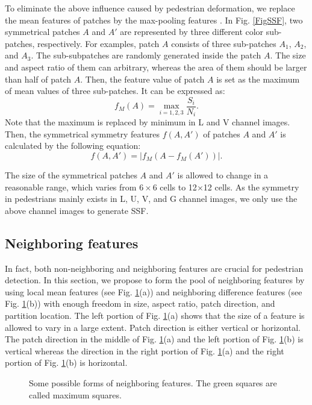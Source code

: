 \documentclass[10pt,twocolumn,letterpaper]{article}
\begin{document}
To eliminate the above influence caused by pedestrian deformation, we 
replace the mean features of patches by the max-pooling features \cite{Wang_Regionlets_ICCV_2013}. In 
Fig. \ref{FigSSF}, two symmetrical patches $A$ and $A'$ are 
represented by three different color sub-patches, respectively. For 
examples, patch $A$ consists of three sub-patches $A_1$, $A_2$, and $A_3$. The sub-subpatches are randomly generated inside the patch $A$. The size and aspect ratio of them can arbitrary, whereas the 
area of them should be larger than half of patch $A$. Then, the feature value of patch 
$A$ is set as the maximum of mean values of three sub-patches. It can be 
expressed as:
\begin{equation}
\label{eqMaxPooling}
f_M(A)=\max_{i=1,2,3}{\frac{S_i}{N_i}}.
\end{equation}
Note that the maximum is replaced by minimum in L and V channel images. Then, the 
symmetrical symmetry features $f(A,A')$ of patches $A$ and $A'$ is calculated by the following equation:
\begin{equation}
\label{eqSSFPooling}
f(A,A')=|f_M(A-f_M(A'))|.
\end{equation}

The size of the symmetrical patches $A$ and $A'$
is allowed to change in a reasonable range, which varies from $6\times 6$ 
cells to 12$\times $12 cells. As the symmetry in pedestrians mainly 
exists in L, U, V, and G channel images, we only use the above channel images to generate SSF.

\subsection{Neighboring features}
In fact, both non-neighboring and neighboring features are crucial for pedestrian detection. In this section, we propose to form the pool of neighboring features by using local mean features (see Fig. \ref{FigNF}(a)) and neighboring difference features (see 
Fig. \ref{FigNF}(b)) with enough freedom in size, aspect ratio, patch direction, and 
partition location. The left portion of Fig. \ref{FigNF}(a) shows that the size of a 
feature is allowed to vary in a large extent. Patch direction is either 
vertical or horizontal. The patch direction in the middle of Fig. \ref{FigNF}(a) and 
the left portion of Fig. \ref{FigNF}(b) is vertical whereas the direction in the right 
portion of Fig. \ref{FigNF}(a) and the right portion of Fig. \ref{FigNF}(b) is horizontal. 


\begin{figure}[!t]
\centering
{}
\vfil
{}
\caption{Some possible forms of neighboring features. The green squares are called maximum squares.}
\label{FigNF}
\end{figure}
\end{document}
